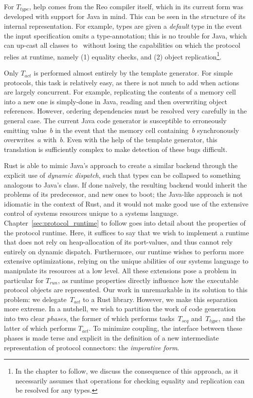 For $T_{type}$, help comes from the Reo compiler itself, which in its current form was developed with support for Java in mind. This can be seen in the structure of its internal representation. For example, types are given a \textit{default} type in the event the input specification omits a type-annotation; this is no trouble for Java, which can up-cast all classes to~ without losing the capabilities on which the protocol relies at runtime, namely (1) equality checks, and (2) object replication\footnote{In the chapter to follow, we discuss the consequence of this approach, as it necessarily assumes that operations for checking equality and replication can be resolved for any types.}.

Only $T_{act}$ is performed almost entirely by the template generator. For simple protocols, this task is relatively easy, as there is not much to add when actions are largely concurrent. For example, replicating the contents of a memory cell into a new one is simply-done in Java, reading and then overwriting object references. However, ordering dependencies must be resolved very carefully in the general case. The current Java code generator is susceptible to erroneously emitting value~$b$ in the event that the memory cell containing~$b$ synchronously overwrites~$a$ with~$b$. Even with the help of the template generator, this translation is sufficiently complex to make detection of these bugs difficult.

Rust is able to mimic Java's approach to create a similar backend through the explicit use of \textit{dynamic dispatch}, such that types can be collapsed to something analogous to Java's  class. If done na\"ively, the resulting backend would inherit the problems of its predecessor, and new ones to boot; the Java-like approach is not idiomatic in the context of Rust, and it would not make good use of the extensive control of systems resources unique to a systems language. Chapter~\ref{sec:protocol_runtime} to follow goes into detail about the properties of the protocol runtime. Here, it suffices to say that we wish to implement a runtime that does not rely on heap-allocation of its port-values, and thus cannot rely entirely on dynamic dispatch. Furthermore, our runtime wishes to perform more extensive optimizations, relying on the unique abilities of our systems language to manipulate its resources at a low level. All these extensions pose a problem in particular for $T_{run}$, as runtime properties directly influence how the executable protocol objects are represented. Our work in unremarkable in its solution to this problem: we delegate~$T_{act}$ to a Rust library. However, we make this separation more extreme. In a nutshell, we wish to partition the work of code generation into two clear \textit{phases}, the former of which performs tasks~$T_{seq}$ and~$T_{type}$, and the latter of which performs $T_{act}$. To minimize coupling, the interface between these phases is made terse and explicit in the definition of a new intermediate representation of protocol connectors: the \textit{imperative form}.

